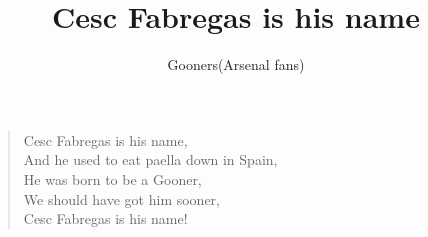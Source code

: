 \documentclass[a4paper,12pt]{article}
\title{Cesc Fabregas is his name}
\author{Gooners(Arsenal fans)}
\date{}
\begin{document}
	
	\maketitle
	
	\begin{verse}
		
		Cesc Fabregas is his name, \\
		And he used to eat paella down in Spain, \\
		He was born to be a Gooner, \\
		We should have got him sooner, \\
		Cesc Fabregas is his name!
		
	\end{verse}
	
\end{document}
